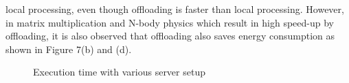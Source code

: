 \documentclass[10pt, conference, compsocconf]{IEEEtran}
\begin{document}
local processing, even though offloading is faster than local processing. 
%
However, in matrix multiplication and N-body physics which result in high
speed-up by offloading, it is also observed that offloading also
saves energy consumption as shown in Figure 7(b) and (d).
%
\begin{figure}[ht]
\centering
{}
\caption{
Execution time with various server setup}
\end{figure}
\end{document}

